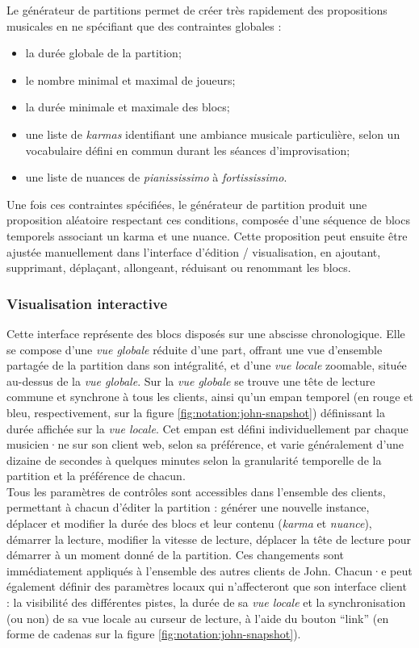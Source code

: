 \noindent Le générateur de partitions permet de créer très rapidement des propositions musicales en ne spécifiant que des contraintes globales :
\vspace{-1em}
\begin{itemize}[noitemsep]
	\item la durée globale de la partition;
	\item le nombre minimal et maximal de joueurs;
	\item la durée minimale et maximale des blocs;
	\item une liste de \textit{karmas} identifiant une ambiance musicale particulière, selon un vocabulaire défini en commun durant les séances d'improvisation;
	\item une liste de nuances de \textit{pianississimo} à \textit{fortississimo}.
\end{itemize}
%
\noindent Une fois ces contraintes spécifiées, le générateur de partition produit une proposition aléatoire respectant ces conditions, composée d'une séquence de blocs temporels associant un karma et une nuance. Cette proposition peut ensuite être ajustée manuellement dans l'interface d'édition / visualisation, en ajoutant, supprimant, déplaçant, allongeant, réduisant ou renommant les blocs.

\subsubsection{Visualisation interactive}

\noindent Cette interface représente des blocs disposés sur une abscisse chronologique. Elle se compose d'une \textit{vue globale} réduite d'une part, offrant une vue d'ensemble partagée de la partition dans son intégralité, et d'une \textit{vue locale} zoomable, située au-dessus de la \textit{vue globale}. Sur la \textit{vue globale} se trouve une tête de lecture commune et synchrone à tous les clients, ainsi qu'un empan temporel (en rouge et bleu, respectivement, sur la figure \ref{fig:notation:john-snapshot}) définissant la durée affichée sur la \textit{vue locale}. Cet empan est défini individuellement par chaque musicien·ne sur son client web, selon sa préférence, et varie généralement d'une dizaine de secondes à quelques minutes selon la granularité temporelle de la partition et la préférence de chacun.\\
\indent Tous les paramètres de contrôles sont accessibles dans l'ensemble des clients, permettant à chacun d'éditer la partition : générer une nouvelle instance, déplacer et modifier la durée des blocs et leur contenu (\textit{karma} et \textit{nuance}), démarrer la lecture, modifier la vitesse de lecture, déplacer la tête de lecture pour démarrer à un moment donné de la partition. Ces changements sont immédiatement appliqués à l'ensemble des autres clients de John. Chacun·e peut également définir des paramètres locaux qui n'affecteront que son interface client : la visibilité des différentes pistes, la durée de sa \textit{vue locale} et la synchronisation (ou non) de sa vue locale au curseur de lecture, à l'aide du bouton ``link'' (en forme de cadenas sur la figure \ref{fig:notation:john-snapshot}).

